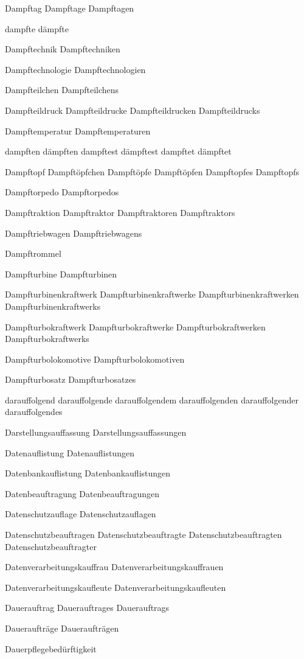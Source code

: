 Dampftag
Dampftage
Dampftagen

dampfte
dämpfte

Dampftechnik
Dampftechniken

Dampftechnologie
Dampftechnologien

Dampfteilchen
Dampfteilchens

Dampfteildruck
Dampfteildrucke
Dampfteildrucken
Dampfteildrucks

Dampftemperatur
Dampftemperaturen

dampften
dämpften
dampftest
dämpftest
dampftet
dämpftet

Dampftopf
Dampftöpfchen
Dampftöpfe
Dampftöpfen
Dampftopfes
Dampftopfs

Dampftorpedo
Dampftorpedos

Dampftraktion
Dampftraktor
Dampftraktoren
Dampftraktors

Dampftriebwagen
Dampftriebwagens

Dampftrommel

Dampfturbine
Dampfturbinen

Dampfturbinenkraftwerk
Dampfturbinenkraftwerke
Dampfturbinenkraftwerken
Dampfturbinenkraftwerks

Dampfturbokraftwerk
Dampfturbokraftwerke
Dampfturbokraftwerken
Dampfturbokraftwerks

Dampfturbolokomotive
Dampfturbolokomotiven

Dampfturbosatz
Dampfturbosatzes

darauffolgend
darauffolgende
darauffolgendem
darauffolgenden
darauffolgender
darauffolgendes

Darstellungsauffassung
Darstellungsauffassungen

Datenauflistung
Datenauflistungen

Datenbankauflistung
Datenbankauflistungen

Datenbeauftragung
Datenbeauftragungen

Datenschutzauflage
Datenschutzauflagen

Datenschutzbeauftragen
Datenschutzbeauftragte
Datenschutzbeauftragten
Datenschutzbeauftragter

Datenverarbeitungskauffrau
Datenverarbeitungskauffrauen

Datenverarbeitungskaufleute
Datenverarbeitungskaufleuten

Dauerauftrag
Dauerauftrages
Dauerauftrags

Daueraufträge
Daueraufträgen

Dauerpflegebedürftigkeit

